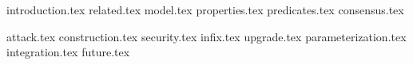 {introduction.tex}
{related.tex}
{model.tex}
{properties.tex}
{predicates.tex}
{consensus.tex}


{attack.tex}
{construction.tex}
{security.tex}
{infix.tex}
{upgrade.tex}
{parameterization.tex}
{integration.tex}
{future.tex}

